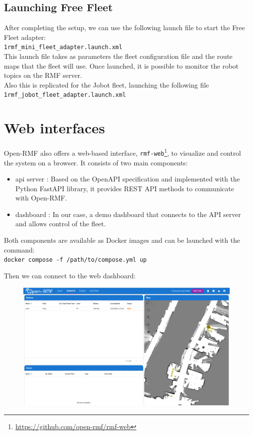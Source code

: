 \subsection{Launching Free Fleet}
After completing the setup, we can use the following launch file to start the Free Fleet adapter:\\
\texttt{1rmf\_mini\_fleet\_adapter.launch.xml}\\
This launch file takes as parameters the fleet configuration file and the route maps that the fleet will use. Once launched, it is possible to monitor the robot topics on the RMF server.
\\Also this is replicated for the Jobot fleet, launching the following file\\
\texttt{1rmf\_jobot\_fleet\_adapter.launch.xml}\\

\newpage
\section{Web interfaces}
Open-RMF also offers a web-based interface, \texttt{rmf-web}\footnote{\href{https://github.com/open-rmf/rmf-web}{https://github.com/open-rmf/rmf-web}}, to visualize and control the system on a browser. It consists of two main components:
\begin{itemize}
	\item api server : Based on the OpenAPI specification and implemented with the Python FastAPI library, it provides REST API methods to communicate with Open-RMF.
	\item dashboard :  In our case, a demo dashboard that connects to the API server and allows control of the fleet.
\end{itemize}

Both components are available as Docker images and can be launched with the command:\\
\texttt{docker compose -f /path/to/compose.yml up}

Then we can connect to the web dashboard:
\begin{figure}[h]
	\centering
	\includegraphics[width=1\linewidth]{img/openRMF-dashboard.png}
\end{figure}

